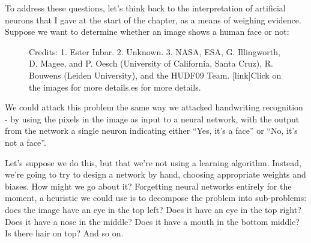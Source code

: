 \documentclass[a4paper,twoside,10pt]{book}
\begin{document}
To address these questions, let's think back to the interpretation of artificial neurons that I gave at the start of the chapter, as a means of weighing evidence. Suppose we want to determine whether an image shows a human face or not:

\begin{figure}
	\caption{Credits: 1. Ester Inbar. 2. Unknown. 3. NASA, ESA, G. Illingworth, D. Magee, and P. Oesch (University of California, Santa Cruz), R. Bouwens (Leiden University), and the HUDF09 Team. [link]Click on the images for more details.es for more details.}
\end{figure}


We could attack this problem the same way we attacked handwriting recognition - by using the pixels in the image as input to a neural network, with the output from the network a single neuron indicating either ``Yes, it's a face'' or ``No, it's not a face''.

Let's suppose we do this, but that we're not using a learning algorithm. Instead, we're going to try to design a network by hand, choosing appropriate weights and biases. How might we go about it? Forgetting neural networks entirely for the moment, a heuristic we could use is to decompose the problem into sub-problems: does the image have an eye in the top left? Does it have an eye in the top right? Does it have a nose in the middle? Does it have a mouth in the bottom middle? Is there hair on top? And so on.
\end{document}

